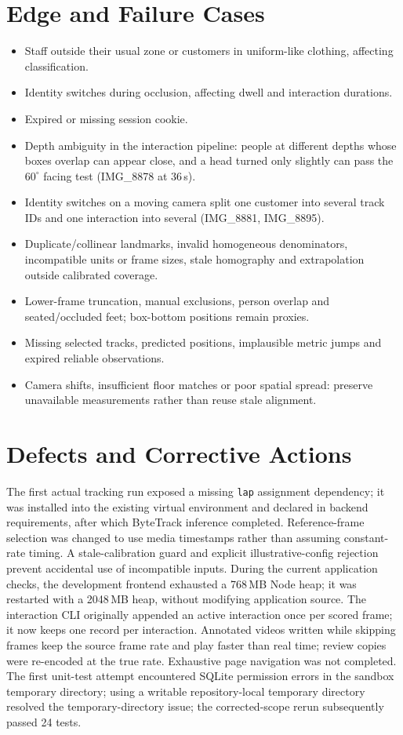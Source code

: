 \section{Edge and Failure Cases}
\begin{itemize}
\item Staff outside their usual zone or customers in uniform-like clothing, affecting classification.
\item Identity switches during occlusion, affecting dwell and interaction durations.
\item Expired or missing session cookie.
\item Depth ambiguity in the interaction pipeline: people at different depths whose boxes overlap can appear close, and a head turned only slightly can pass the $60^\circ$ facing test (IMG\_8878 at 36\,s).
\item Identity switches on a moving camera split one customer into several track IDs and one interaction into several (IMG\_8881, IMG\_8895).
\item Duplicate/collinear landmarks, invalid homogeneous denominators, incompatible units or frame sizes, stale homography and extrapolation outside calibrated coverage.
\item Lower-frame truncation, manual exclusions, person overlap and seated/occluded feet; box-bottom positions remain proxies.
\item Missing selected tracks, predicted positions, implausible metric jumps and expired reliable observations.
\item Camera shifts, insufficient floor matches or poor spatial spread: preserve unavailable measurements rather than reuse stale alignment.
\end{itemize}

\section{Defects and Corrective Actions}
The first actual tracking run exposed a missing \texttt{lap} assignment dependency; it was installed into the existing virtual environment and declared in backend requirements, after which ByteTrack inference completed. Reference-frame selection was changed to use media timestamps rather than assuming constant-rate timing. A stale-calibration guard and explicit illustrative-config rejection prevent accidental use of incompatible inputs. During the current application checks, the development frontend exhausted a 768\,MB Node heap; it was restarted with a 2048\,MB heap, without modifying application source. The interaction CLI originally appended an active interaction once per scored frame; it now keeps one record per interaction. Annotated videos written while skipping frames keep the source frame rate and play faster than real time; review copies were re-encoded at the true rate. Exhaustive page navigation was not completed. The first unit-test attempt encountered SQLite permission errors in the sandbox temporary directory; using a writable repository-local temporary directory resolved the temporary-directory issue; the corrected-scope rerun subsequently passed 24 tests.

